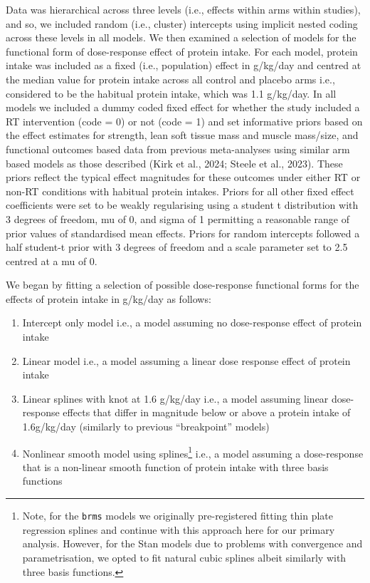\documentclass[
]{article}
\providecommand{\tightlist}{%
  \setlength{\itemsep}{0pt}\setlength{\parskip}{0pt}}
\begin{document}
Data was hierarchical across three levels (i.e., effects within arms
within studies), and so, we included random (i.e., cluster) intercepts
using implicit nested coding across these levels in all models. We then
examined a selection of models for the functional form of dose-response
effect of protein intake. For each model, protein intake was included as
a fixed (i.e., population) effect in g/kg/day and centred at the median
value for protein intake across all control and placebo arms i.e.,
considered to be the habitual protein intake, which was 1.1 g/kg/day. In
all models we included a dummy coded fixed effect for whether the study
included a RT intervention (code = 0) or not (code = 1) and set
informative priors based on the effect estimates for strength, lean soft
tissue mass and muscle mass/size, and functional outcomes based data
from previous meta-analyses using similar arm based models as those
described (Kirk et al., 2024; Steele et al., 2023). These priors reflect
the typical effect magnitudes for these outcomes under either RT or
non-RT conditions with habitual protein intakes. Priors for all other
fixed effect coefficients were set to be weakly regularising using a
student t distribution with 3 degrees of freedom, mu of 0, and sigma of
1 permitting a reasonable range of prior values of standardised mean
effects. Priors for random intercepts followed a half student-t prior
with 3 degrees of freedom and a scale parameter set to 2.5 centred at a
mu of 0.

We began by fitting a selection of possible dose-response functional
forms for the effects of protein intake in g/kg/day as follows:

\begin{enumerate}
\def\labelenumi{\arabic{enumi}.}
\tightlist
\item
  Intercept only model i.e., a model assuming no dose-response effect of
  protein intake
\item
  Linear model i.e., a model assuming a linear dose response effect of
  protein intake
\item
  Linear splines with knot at 1.6 g/kg/day i.e., a model assuming linear
  dose-response effects that differ in magnitude below or above a
  protein intake of 1.6g/kg/day (similarly to previous ``breakpoint''
  models)
\item
  Nonlinear smooth model using splines\footnote{Note, for the
    \texttt{brms} models we originally pre-registered fitting thin plate
    regression splines and continue with this approach here for our
    primary analysis. However, for the Stan models due to problems with
    convergence and parametrisation, we opted to fit natural cubic
    splines albeit similarly with three basis functions.} i.e., a model
  assuming a dose-response that is a non-linear smooth function of
  protein intake with three basis functions
\end{enumerate}
\end{document}
